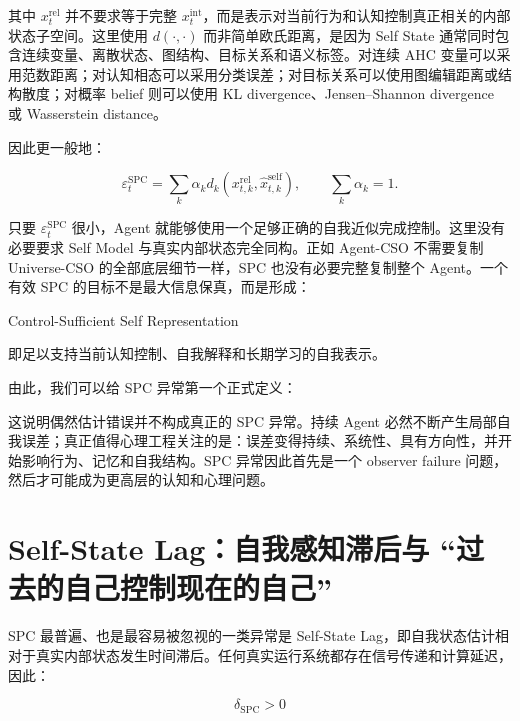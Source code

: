 其中 $x_t^{\mathrm{rel}}$ 并不要求等于完整 $x_t^{\mathrm{int}}$，而是表示对当前行为和认知控制真正相关的内部状态子空间。这里使用 $d(\cdot,\cdot)$ 而非简单欧氏距离，是因为 Self State 通常同时包含连续变量、离散状态、图结构、目标关系和语义标签。对连续 AHC 变量可以采用范数距离；对认知相态可以采用分类误差；对目标关系可以使用图编辑距离或结构散度；对概率 belief 则可以使用 KL divergence、Jensen--Shannon divergence 或 Wasserstein distance。

因此更一般地：

\[
\varepsilon_t^{\mathrm{SPC}}
=
\sum_k
\alpha_k
d_k
\left(
x_{t,k}^{\mathrm{rel}},
\hat{x}_{t,k}^{\mathrm{self}}
\right),
\qquad
\sum_k\alpha_k=1.
\]

只要 $\varepsilon_t^{\mathrm{SPC}}$ 很小，Agent 就能够使用一个足够正确的自我近似完成控制。这里没有必要要求 Self Model 与真实内部状态完全同构。正如 Agent-CSO 不需要复制 Universe-CSO 的全部底层细节一样，SPC 也没有必要完整复制整个 Agent。一个有效 SPC 的目标不是最大信息保真，而是形成：

\begin{statementbox}
Control-Sufficient Self Representation
\end{statementbox}

即足以支持当前认知控制、自我解释和长期学习的自我表示。

由此，我们可以给 SPC 异常第一个正式定义：

\begin{statementbox}
\centering
{}
\end{statementbox}

这说明偶然估计错误并不构成真正的 SPC 异常。持续 Agent 必然不断产生局部自我误差；真正值得心理工程关注的是：误差变得持续、系统性、具有方向性，并开始影响行为、记忆和自我结构。SPC 异常因此首先是一个 observer failure 问题，然后才可能成为更高层的认知和心理问题。

\section{Self-State Lag：自我感知滞后与 ``过去的自己控制现在的自己''}

SPC 最普遍、也是最容易被忽视的一类异常是 Self-State Lag，即自我状态估计相对于真实内部状态发生时间滞后。任何真实运行系统都存在信号传递和计算延迟，因此：

\[
\delta_{\mathrm{SPC}}>0
\]


